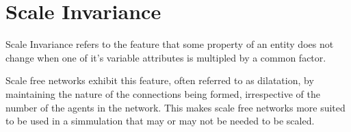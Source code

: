 
\chapter{Scale Invariance} %

\label{AppendixA} %


Scale Invariance refers to the feature that some property of an entity does not change when one of it's variable attributes is multipled by a common factor. 

Scale free networks exhibit this feature, often referred to as dilatation, by maintaining the nature of the connections being formed, irrespective of the number of the agents in the network.
This makes scale free networks more suited to be used in a simmulation that may or may not be needed to be scaled. 